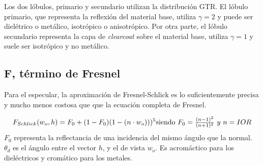                 Los dos l\'obulos, primario y secundario utilizan la distribuci\'on GTR. El l\'obulo primario,
                que representa la reflexi\'on del material base, utiliza $\gamma = 2$ y puede ser diel\'etrico o met\'alico,
                isotr\'opico o anisotr\'opico. Por otra parte, el l\'obulo secundario representa la capa de \textit{clearcoat}
                sobre el material base, utiliza $\gamma = 1$ y suele ser isotr\'opico y no met\'alico.\\

            \subsection*{F, t\'ermino de Fresnel}
                Para el especular, la aproximaci\'on de Fresnel-Schlick \autocite{schlick} es lo suficientemente precisa y mucho menos costosa que
                que la ecuaci\'on completa de Fresnel.
    
                \begin{equation}
                    F_{Schlick}(w_o, h) = F_0 + (1 - F_0) (1 - (n\cdot{w_o})))^5
                    $$
                    $$
                    \textrm{siendo}\ F_0 = \frac
                    {(n - 1)^2}
                    {(n + 1)^2}
                    \ y \ n = IOR
                \end{equation}
                \singlespacing
                $F_0$ representa la reflectancia de una incidencia del mismo \'angulo que la normal. $\theta_d$ es el \'angulo
                entre el vector $h$, y el de vista $w_o$. Es acrom\'actico para los diel\'ectricos y crom\'atico para los metales.\\
    
